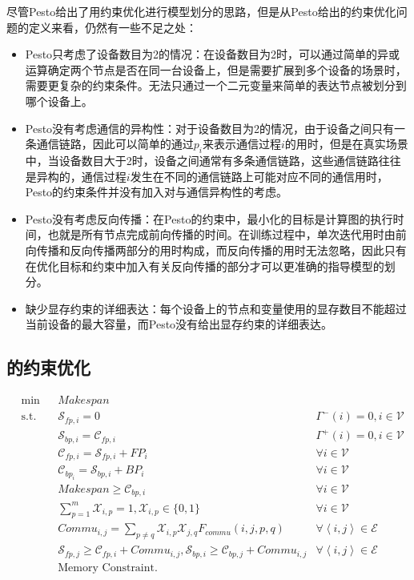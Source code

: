 尽管Pesto给出了用约束优化进行模型划分的思路，但是从Pesto给出的约束优化问题的定义来看，仍然有一些不足之处：
\begin{itemize}
	\item Pesto只考虑了设备数目为2的情况：在设备数目为2时，可以通过简单的异或运算确定两个节点是否在同一台设备上，但是需要扩展到多个设备的场景时，需要更复杂的约束条件。无法只通过一个二元变量来简单的表达节点被划分到哪个设备上。
	\item Pesto没有考虑通信的异构性：对于设备数目为2的情况，由于设备之间只有一条通信链路，因此可以简单的通过$p_i$来表示通信过程$i$的用时，但是在真实场景中，当设备数目大于2时，设备之间通常有多条通信链路，这些通信链路往往是异构的，通信过程$i$发生在不同的通信链路上可能对应不同的通信用时，Pesto的约束条件并没有加入对与通信异构性的考虑。
	\item Pesto没有考虑反向传播：在Pesto的约束中，最小化的目标是计算图的执行时间，也就是所有节点完成前向传播的时间。在训练过程中，单次迭代用时由前向传播和反向传播两部分的用时构成，而反向传播的用时无法忽略，因此只有在优化目标和约束中加入有关反向传播的部分才可以更准确的指导模型的划分。
	\item 缺少显存约束的详细表达：每个设备上的节点和变量使用的显存数目不能超过当前设备的最大容量，而Pesto没有给出显存约束的详细表达。
\end{itemize}

\subsection{\sys{}的约束优化}
\label{sec:core}
\begin{align}
	& \text{min} & & \mathit{Makespan} \label{eq:op-target} & \\
	& \text{s.t.} & & \mathcal{S}_{fp,i}=0 &\Gamma^{-}(i)=0, i\in \mathcal{V} \label{eq:cons1}\\
	& & & \mathcal{S}_{bp,i}=\mathcal{C}_{fp,i} &\Gamma^{+}(i)=0,i\in \mathcal{V}\nonumber \\
	& & & \mathcal{C}_{fp,i} = \mathcal{S}_{fp,i} + \mathit{FP}_i & \forall i\in \mathcal{V} \label{eq:cons2}\\
	& & & \mathcal{C}_{bp_i} = \mathcal{S}_{bp,i} + \mathit{BP}_i & \forall i\in \mathcal{V}\nonumber \\
	& & & \mathit{Makespan} \ge \mathcal{C}_{bp,i} & \forall i\in \mathcal{V} \label{eq:cons3} \\
	& & & \sum_{p=1}^{m} \mathcal{X}_{i,p}=1, \mathcal{X}_{i,p}\in\{0,1\} & \forall i\in \mathcal{V} \label{eq:cons4} \\
	& & & \mathit{Commu}_{i,j} = \sum_{p\neq q}\mathcal{X}_{i,p}\mathcal{X}_{j,q}F_{\mathit{commu}}(i,j,p,q) & \forall \left\langle i,j\right\rangle \in \mathcal{E} \label{eq:cons5}\\
	& & & \mathcal{S}_{fp,j} \ge \mathcal{C}_{fp,i} + \mathit{Commu}_{i,j}, \mathcal{S}_{bp,i} \ge \mathcal{C}_{bp,j} + \mathit{Commu}_{i,j} &\forall \left\langle i,j\right\rangle \in \mathcal{E} \nonumber \\
	& & & \text{Memory Constraint.} \label{eq:cons6}
\end{align}
	
